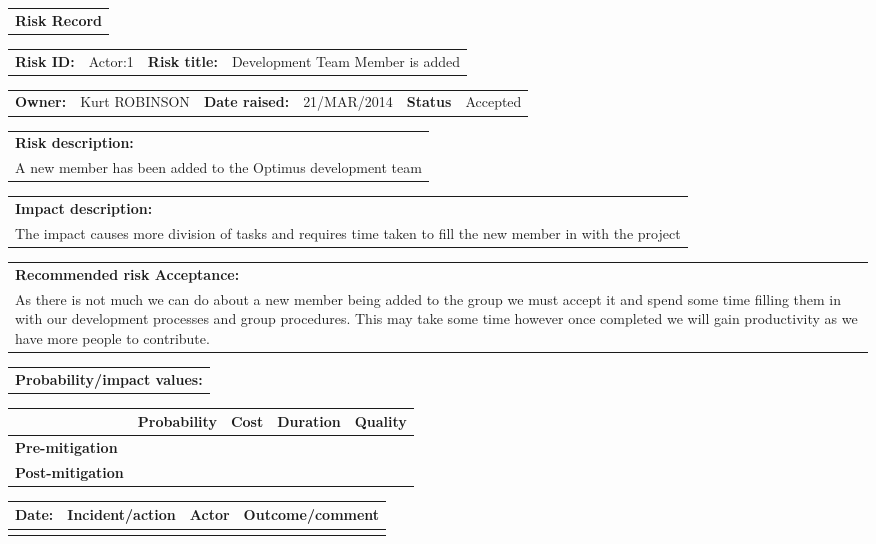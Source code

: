 \begin{table}
	\begin{tabularx}{\textwidth}{| X |}
		\hline
		\textbf{Risk Record} \\
	\end{tabularx}
	\begin{tabularx}{\textwidth}{| l | X | l | X |}
		\hline
		\textbf{Risk ID:} & Actor:1 & \textbf{Risk title:} & Development Team Member is added \\
	\end{tabularx}
	\begin{tabularx}{\textwidth}{| l | X | l | X | l | X |}
		\hline
		\textbf{Owner:} & Kurt ROBINSON & \textbf{Date raised:} & 21/MAR/2014 & \textbf{Status} & Accepted \\
	\end{tabularx}
	\begin{tabularx}{\textwidth}{| X |}
		\hline
		\textbf{Risk description:} \\ A new member has been added to the Optimus development team \\
	\end{tabularx}
	\begin{tabularx}{\textwidth}{| X |}
		\hline
		\textbf{Impact description:} \\ The impact causes more division of tasks and requires time taken to fill the new member in with the project \\
	\end{tabularx}
	\begin{tabularx}{\textwidth}{| X |}
		\hline
		\textbf{Recommended risk Acceptance:} \\ As there is not much we can do about a new member being added to the group we must accept it and spend some time filling them in with our development processes and group procedures. This may take some time however once completed we will gain productivity as we have more people to contribute. \\
	\end{tabularx}
	\begin{tabularx}{\textwidth}{| X |}
		\hline
		\textbf{Probability/impact values:} \\
	\end{tabularx}
	\begin{tabularx}{\textwidth}{| l | l | X | X | X |}
		\hline
		 &  \textbf{Probability} & \textbf{Cost} & \textbf{Duration} & \textbf{Quality} \\ \hline
		\textbf{Pre-mitigation} & & & & \\ \hline
		\textbf{Post-mitigation} & & & & \\ \hline \hline
	\end{tabularx}
	\begin{tabularx}{\textwidth}{| l | X | l | X |}
		\hline
		\textbf{Date:} & \textbf{Incident/action} & \textbf{Actor} & \textbf{Outcome/comment} \\ \hline
		 & &  &  \\ \hline
	\end{tabularx}
\end{table}

